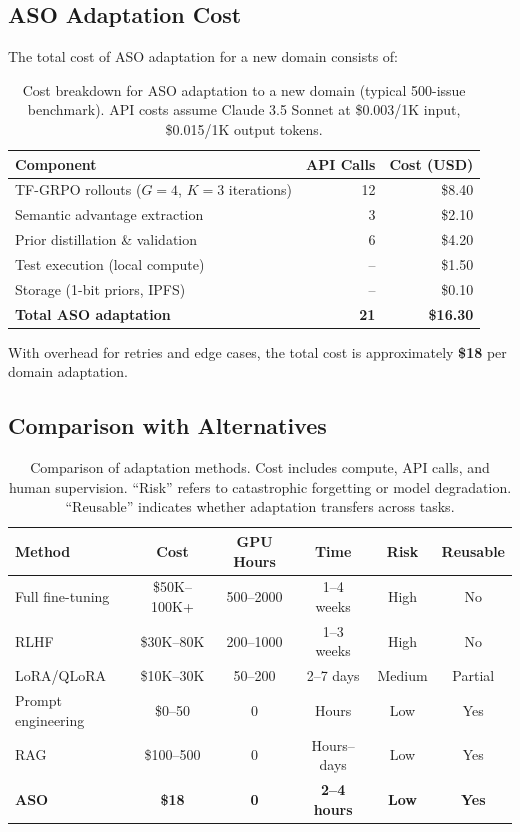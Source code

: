 \documentclass[11pt]{article}
\begin{document}
\subsection{ASO Adaptation Cost}

The total cost of ASO adaptation for a new domain consists of:

\begin{table}[h]
\centering
\begin{tabular}{lrr}
\toprule
Component & API Calls & Cost (USD) \\
\midrule
TF-GRPO rollouts ($G=4$, $K=3$ iterations) & 12 & \$8.40 \\
Semantic advantage extraction & 3 & \$2.10 \\
Prior distillation \& validation & 6 & \$4.20 \\
Test execution (local compute) & -- & \$1.50 \\
Storage (1-bit priors, IPFS) & -- & \$0.10 \\
\midrule
\textbf{Total ASO adaptation} & \textbf{21} & \textbf{\$16.30} \\
\bottomrule
\end{tabular}
\caption{Cost breakdown for ASO adaptation to a new domain (typical 500-issue
benchmark). API costs assume Claude 3.5 Sonnet at \$0.003/1K input,
\$0.015/1K output tokens.}
\label{tab:aso-cost}
\end{table}

With overhead for retries and edge cases, the total cost is approximately
\textbf{\$18} per domain adaptation.

\subsection{Comparison with Alternatives}

\begin{table}[H]
\centering
\begin{tabular}{lccccc}
\toprule
Method & Cost & GPU Hours & Time & Risk & Reusable \\
\midrule
Full fine-tuning & \$50K--100K+ & 500--2000 & 1--4 weeks & High & No \\
RLHF & \$30K--80K & 200--1000 & 1--3 weeks & High & No \\
LoRA/QLoRA & \$10K--30K & 50--200 & 2--7 days & Medium & Partial \\
Prompt engineering & \$0--50 & 0 & Hours & Low & Yes \\
RAG & \$100--500 & 0 & Hours--days & Low & Yes \\
\textbf{ASO} & \textbf{\$18} & \textbf{0} & \textbf{2--4 hours} & \textbf{Low} & \textbf{Yes} \\
\bottomrule
\end{tabular}
\caption{Comparison of adaptation methods. Cost includes compute, API calls,
and human supervision. ``Risk'' refers to catastrophic forgetting or model
degradation. ``Reusable'' indicates whether adaptation transfers across tasks.}
\label{tab:cost-comparison}
\end{table}
\end{document}
